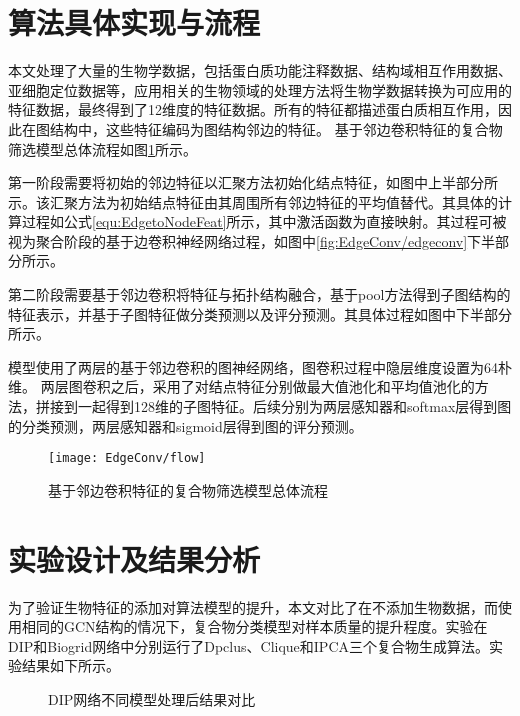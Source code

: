 \section{算法具体实现与流程}
\label{section:EdgeConv:flow}
本文处理了大量的生物学数据，包括蛋白质功能注释数据、结构域相互作用数据、亚细胞定位数据等，应用相关的生物领域的处理方法将生物学数据转换为可应用的特征数据，最终得到了12维度的特征数据。所有的特征都描述蛋白质相互作用，因此在图结构中，这些特征编码为图结构邻边的特征。
基于邻边卷积特征的复合物筛选模型总体流程如图\ref{fig:EdgeConv/flow}所示。

第一阶段需要将初始的邻边特征以汇聚方法初始化结点特征，如图中上半部分所示。该汇聚方法为初始结点特征由其周围所有邻边特征的平均值替代。其具体的计算过程如公式\ref{equ:EdgetoNodeFeat}所示，其中激活函数为直接映射。其过程可被视为聚合阶段的基于边卷积神经网络过程，如图中\ref{fig:EdgeConv/edgeconv}下半部分所示。

第二阶段需要基于邻边卷积将特征与拓扑结构融合，基于pool方法得到子图结构的特征表示，并基于子图特征做分类预测以及评分预测。其具体过程如图中下半部分所示。

模型使用了两层的基于邻边卷积的图神经网络，图卷积过程中隐层维度设置为64朴维。
两层图卷积之后，采用了对结点特征分别做最大值池化和平均值池化的方法，拼接到一起得到128维的子图特征。后续分别为两层感知器和softmax层得到图的分类预测，两层感知器和sigmoid层得到图的评分预测。


\begin{figure}[htbp]
    \centering
    \texttt{[image: EdgeConv/flow]}
    \caption{基于邻边卷积特征的复合物筛选模型总体流程}
    \label{fig:EdgeConv/flow}
\end{figure}

\section{实验设计及结果分析}
\label{section:EdgeConv:experience}

为了验证生物特征的添加对算法模型的提升，本文对比了在不添加生物数据，而使用相同的GCN结构的情况下，复合物分类模型对样本质量的提升程度。实验在DIP和Biogrid网络中分别运行了Dpclus、Clique和IPCA三个复合物生成算法。实验结果如下所示。
\begin{figure}[htbp]
    \centering
    \vskip0.2cm
    \caption{DIP网络不同模型处理后结果对比}
    \label{fig:result/DIP/edge}
\end{figure}

